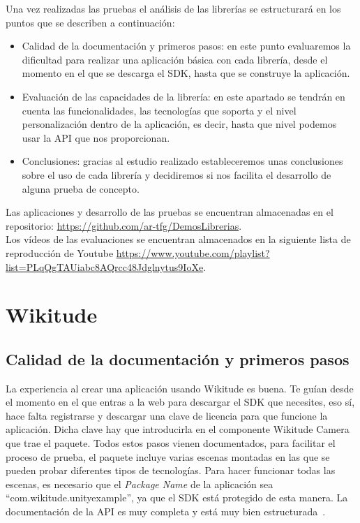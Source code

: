 Una vez realizadas las pruebas el análisis de las librerías se estructurará en los puntos que se describen a continuación:
\begin{itemize}
\item Calidad de la documentación y primeros pasos: en este punto evaluaremos la dificultad para realizar una aplicación básica con cada librería, desde el momento en el que se descarga el SDK, hasta que se construye la aplicación. 
\item Evaluación de las capacidades de la librería: en este apartado se tendrán en cuenta las funcionalidades, las tecnologías que soporta y el nivel personalización dentro de la aplicación, es decir, hasta que nivel podemos usar la API que nos proporcionan.
\item Conclusiones: gracias al estudio realizado estableceremos unas conclusiones sobre el uso de cada librería y decidiremos si nos facilita el desarrollo de alguna prueba de concepto.
\end{itemize}

Las aplicaciones y desarrollo de las pruebas se encuentran almacenadas en el repositorio: \url{https://github.com/ar-tfg/DemosLibrerias}.\\

Los vídeos de las evaluaciones se encuentran almacenados en la siguiente lista de reproducción de Youtube \url{ https://www.youtube.com/playlist?list=PLqQgTAUiabc8AQrcc48Jdglnytus9IoXe}.



\section{Wikitude}

\subsection{Calidad de la documentación y primeros pasos}
La experiencia al crear una aplicación usando Wikitude es buena. Te guían desde el momento en el que entras a la web para descargar el SDK que necesites, eso sí, hace falta registrarse y descargar una clave de licencia para que funcione la aplicación. Dicha clave hay que introducirla en el componente Wikitude Camera que trae el paquete. Todos estos pasos vienen documentados, para facilitar el proceso de prueba, el paquete incluye varias escenas montadas en las que se pueden probar diferentes tipos de tecnologías. Para hacer funcionar todas las escenas, es necesario que el \textit{Package Name} de la aplicación sea ``com.wikitude.unityexample'', ya que el SDK está protegido de esta manera. La documentación de la API es muy completa y está muy bien estructurada~\cite{WikitudeDoc}.
